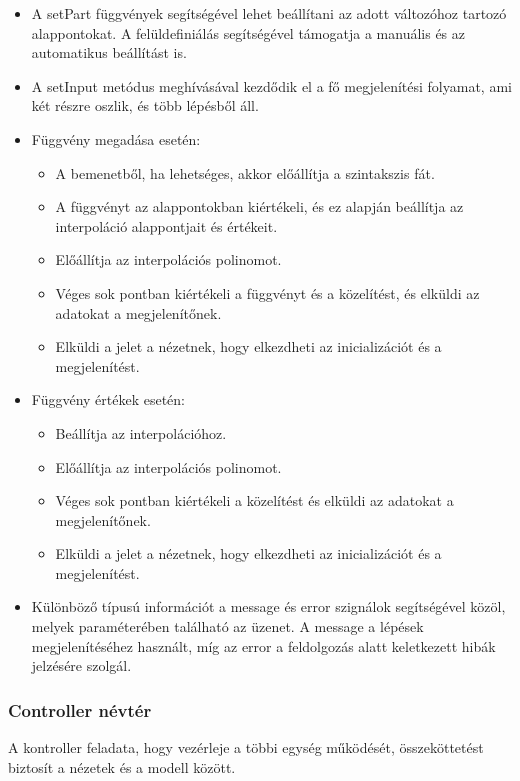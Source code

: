 \documentclass[12pt]{report}
\begin{document}
\begin{itemize}
\item A setPart függvények segítségével lehet beállítani az adott változóhoz tartozó alappontokat. A felüldefiniálás segítségével támogatja a manuális és az automatikus beállítást is.
\item A setInput metódus meghívásával kezdődik el a fő megjelenítési folyamat, ami két részre oszlik, és több lépésből áll.
\item Függvény megadása esetén:
	\begin{itemize}
		\item A bemenetből, ha lehetséges, akkor előállítja a szintakszis fát.
		\item A függvényt az alappontokban kiértékeli, és ez alapján beállítja az interpoláció alappontjait és értékeit.
		\item Előállítja az interpolációs polinomot.
		\item Véges sok pontban kiértékeli a függvényt és a közelítést, és elküldi az adatokat a megjelenítőnek.
		\item Elküldi a jelet a nézetnek, hogy elkezdheti az inicializációt és a megjelenítést.
	\end{itemize}
\item Függvény értékek esetén:
	\begin{itemize}
		\item Beállítja az interpolációhoz.
		\item Előállítja az interpolációs polinomot.
		\item Véges sok pontban kiértékeli a közelítést és elküldi az adatokat a megjelenítőnek.
		\item Elküldi a jelet a nézetnek, hogy elkezdheti az inicializációt és a megjelenítést.
	\end{itemize}
\item Különböző típusú információt a message és error szignálok segítségével közöl, melyek paraméterében található az üzenet. A message a lépések megjelenítéséhez használt, míg az error a feldolgozás alatt keletkezett hibák jelzésére szolgál.
\end{itemize}

\subsubsection{Controller névtér}
A kontroller feladata, hogy vezérleje a többi egység működését, összeköttetést biztosít a nézetek és a modell között. 
\end{document}
